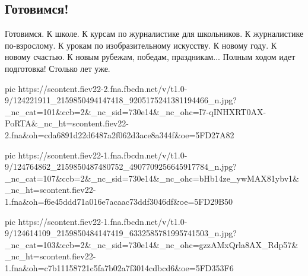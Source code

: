  
 
 

\subsection{Готовимся!}

\obeycr
Готовимся.
К школе.
К курсам по журналистике для школьников.
К журналистике по-взрослому.
К урокам по изобразительному искусству.
К новому году.
К новому счастью.
К новым рубежам, победам, праздникам...
Полным ходом идет подготовка!
Столько лет уже.
\restorecr

\ifcmt
pic https://scontent.fiev22-2.fna.fbcdn.net/v/t1.0-9/124221911_2159850494147418_9205175241381194466_n.jpg?_nc_cat=101&ccb=2&_nc_sid=730e14&_nc_ohc=I7-qINHXRT0AX-PoRTA&_nc_ht=scontent.fiev22-2.fna&oh=cda6891d22d6487a2f062d3ace8a344f&oe=5FD27A82

pic https://scontent.fiev22-1.fna.fbcdn.net/v/t1.0-9/124764862_2159850487480752_4907709256645917784_n.jpg?_nc_cat=107&ccb=2&_nc_sid=730e14&_nc_ohc=bHb14ze_ywMAX81ybv1&_nc_ht=scontent.fiev22-1.fna&oh=f6e45ddd71a016e7acaac73ddf3046df&oe=5FD29B50

pic https://scontent.fiev22-1.fna.fbcdn.net/v/t1.0-9/124614109_2159850484147419_6332585781995741503_n.jpg?_nc_cat=103&ccb=2&_nc_sid=730e14&_nc_ohc=gzzAMxQrla8AX_Rdp57&_nc_ht=scontent.fiev22-1.fna&oh=c7b11158721c5fa7b02a7f3014cdbcd6&oe=5FD353F6
\fi
